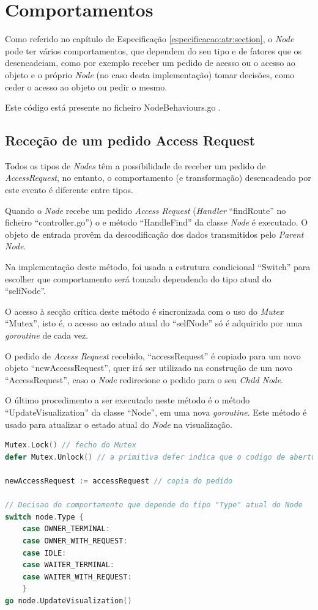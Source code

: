 \section{Comportamentos}
Como referido no capítulo de Especificação \ref{especificacao:atr:section}, 
o \emph{Node} pode ter vários comportamentos, 
que dependem do seu tipo e de fatores que os desencadeiam, como por exemplo receber um pedido de acesso ou o acesso ao objeto e 
o próprio \emph{Node} (no caso desta implementação) tomar decisões, como ceder o acesso ao objeto ou pedir o mesmo.

Este código está presente no ficheiro NodeBehaviours.go .

\subsection*{Receção de um pedido Access Request}
Todos os tipos de \emph{Nodes} têm a possibilidade de receber um pedido de \emph{AccessRequest}, no entanto, o comportamento (e transformação) desencadeado por este evento é diferente entre tipos.

Quando o \emph{Node} recebe um pedido \emph{Access Request} (\emph{Handler} ``findRoute'' no ficheiro ``controller.go'') o
e método ``HandleFind'' da classe \emph{Node} é executado.
O objeto de entrada provêm da descodificação dos dados transmitidos pelo \emph{Parent Node}.

Na implementação deste método, foi usada a estrutura condicional ``Switch'' para escolher que comportamento será tomado 
dependendo do tipo atual do ``selfNode''.

O acesso à secção crítica deste método é sincronizada com o uso do \emph{Mutex} ``Mutex'', isto é,
o acesso ao estado atual do ``selfNode'' só é adquirido por uma \emph{goroutine} de cada vez.

O pedido de \emph{Access Request} recebido, ``accessRequest'' é copiado para um novo objeto ``newAccessRequest'',
quer irá ser utilizado na construção de um novo ``AccessRequest'',
caso o \emph{Node} redirecione o pedido para o seu \emph{Child Node}.

O último procedimento a ser executado neste método é o método ``UpdateVisualization'' da classe ``Node'', em uma nova \emph{goroutine}.
Este método é usado para atualizar o estado atual do \emph{Node} na visualização.

\begin{lstlisting}[caption={\emph{Switch} de decisão do comportamento.},language=Go]
Mutex.Lock() // fecho do Mutex
defer Mutex.Unlock() // a primitiva defer indica que o codigo de abertura do Mutex sera corrido caso a execucao deste metodo termine

newAccessRequest := accessRequest // copia do pedido

// Decisao do comportamento que depende do tipo "Type" atual do Node
switch node.Type {
	case OWNER_TERMINAL:
	case OWNER_WITH_REQUEST:
	case IDLE:
	case WAITER_TERMINAL:
	case WAITER_WITH_REQUEST:
	}
go node.UpdateVisualization()
\end{lstlisting}

